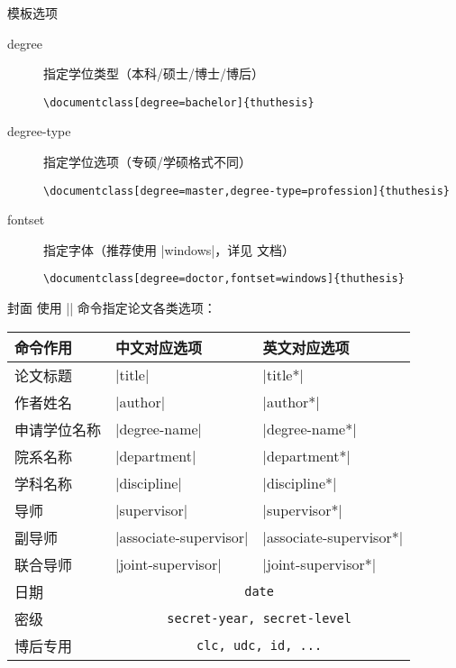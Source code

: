 \begin{frame}[fragile]{模板选项}
\begin{description}
\item[degree] 指定学位类型（本科/硕士/博士/博后）
  \begin{lstlisting}[basicstyle=\ttfamily]
\documentclass[degree=bachelor]{thuthesis}
  \end{lstlisting}
\item[degree-type] 指定学位选项（专硕/学硕格式不同）
  \begin{lstlisting}[basicstyle=\ttfamily]
\documentclass[degree=master,degree-type=profession]{thuthesis}
  \end{lstlisting}
\item[fontset] 指定字体（推荐使用 |windows|，详见  文档）
  \begin{lstlisting}[basicstyle=\ttfamily]
\documentclass[degree=doctor,fontset=windows]{thuthesis}
  \end{lstlisting}
\end{description}
\end{frame}

\begin{frame}[fragile]{封面}
  使用 |\thusetup| 命令指定论文各类选项：
  \begin{table}[h]
    \centering
\footnotesize
  \begin{tabular}{lll} \toprule
    命令作用 & 中文对应选项 & 英文对应选项 \\ \midrule
  论文标题 & |title| & |title*| \\
  作者姓名&  |author| &|author*|\\
  申请学位名称 & |degree-name|&|degree-name*|\\
  院系名称 & |department| & |department*|\\
  学科名称 & |discipline| & |discipline*|\\
  导师 & |supervisor| & |supervisor*|\\
  副导师 & |associate-supervisor| & |associate-supervisor*|\\
  联合导师 & |joint-supervisor| & |joint-supervisor*|\\
  日期 & \multicolumn{2}{c}{\texttt{date}}\\
  密级 & \multicolumn{2}{c}{\texttt{secret-year, secret-level}}\\
  博后专用 & \multicolumn{2}{c}{\texttt{clc, udc, id, ...}} \\ \bottomrule
  \end{tabular}
  \end{table}
\end{frame}

